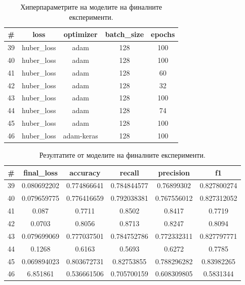 \documentclass{article}
\begin{document}
\begin{table}[H]
\centering
\captionsetup{justification=centering}
\begin{tabular}{|c||c|c|c|c|}
\hline
\# & loss & optimizer & batch\_size & epochs\\
\hline
39 & huber\_loss & adam & 128 & 100\\
40 & huber\_loss & adam & 128 & 100\\
41 & huber\_loss & adam & 128 & 60\\
42 & huber\_loss & adam & 128 & 32\\
43 & huber\_loss & adam & 128 & 100\\
44 & huber\_loss & adam & 128 & 74\\
45 & huber\_loss & adam & 128 & 100\\
46 & huber\_loss & adam-keras & 128 & 100\\
\hline
\end{tabular}
\caption{Хиперпараметрите на моделите на финалните експерименти.}
\end{table}

\begin{table}[H]
\centering
\captionsetup{justification=centering}
\begin{tabular}{|c||c|c|c|c|c|}
\hline
\# & final\_loss & accuracy & recall & precision & f1\\
\hline
39 & 0.080692202 & 0.774866641 & 0.784844577 & 0.76899302 & 0.827800274\\
40 & 0.079659775 & 0.776416659 & 0.792038381 & 0.767556012 & 0.827312052\\
41 & 0.087 & 0.7711 & 0.8502 & 0.8417 & 0.7719\\
42 & 0.0703 & 0.8056 & 0.8713 & 0.8247 & 0.8094\\
43 & 0.079699069 & 0.777037501 & 0.784752786 & 0.772332311 & 0.827797771\\
44 & 0.1268 & 0.6163 & 0.5693 & 0.6272 & 0.7785\\
45 & 0.069894023 & 0.803672731 & 0.82753855 & 0.788296282 & 0.83982265\\
46 & 6.851861 & 0.536661506 & 0.705700159 & 0.608309805 & 0.5831344\\
\hline
\end{tabular}
\caption{Резултатите от моделите на финалните експерименти.}
\end{table}
\end{document}
